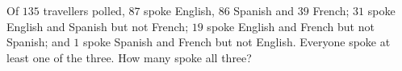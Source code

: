 Of $135$ travellers polled, $87$ spoke English, $86$ Spanish and $39$ French; $31$ spoke English and Spanish but not French; $19$ spoke English and French but not Spanish; and $1$ spoke Spanish and French but not English. Everyone spoke at least one of the three. How many spoke all three?
